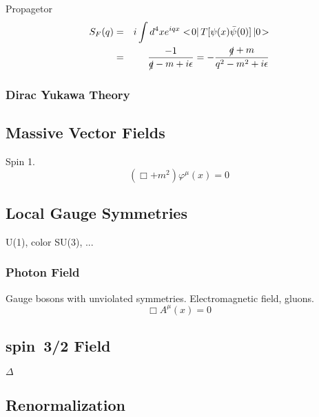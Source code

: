 \documentclass{article}
\newcommand{\bra}[0]{<\!}
\newcommand{\braend}[0]{|\,}
\newcommand{\ketend}[0]{\,|}
\newcommand{\ket}[0]{\!>}
\begin{document}
Propagetor
\begin{eqnarray}
S_F(q) &=& i \int d^4x e^{iqx}
\bra 0 \braend T[\psi(x) \bar{\psi}(0)]
\ketend 0 \ket
\nonumber\\
&=&
\frac{-1}{\slashed{q} - m + i \epsilon}
=
- \frac{\slashed{q} + m}{ q^2 - m^2 + i \epsilon}
\end{eqnarray}

\begin{comment}
\subsubsection{Majorana Field}
Massless, spin1/2, selfconjugate.
\begin{equation}
i \slashed{\partial} \psi(x) = 0\,,
\hspace{3mm}
\bar{\psi}(x) i \stackrel{\leftarrow}{\slashed{\partial}}   = 0
\end{equation}
\end{comment}
\subsubsection{Dirac Yukawa Theory}

\newpage
\subsection{Massive Vector  Fields}
Spin 1.  
\begin{equation}
\left( \Box + m^2 \right) \varphi^\mu(x) = 0
\end{equation}
\subsection{Local Gauge Symmetries}
U(1), color SU(3), ...
\subsubsection{Photon Field}
Gauge bosons with unviolated symmetries. Electromagnetic field, gluons.
\begin{equation}
\Box A^\mu(x) = 0
\end{equation}
\subsection{spin~3/2 Field}
$\Delta$
\subsection{Renormalization}
\end{document}
